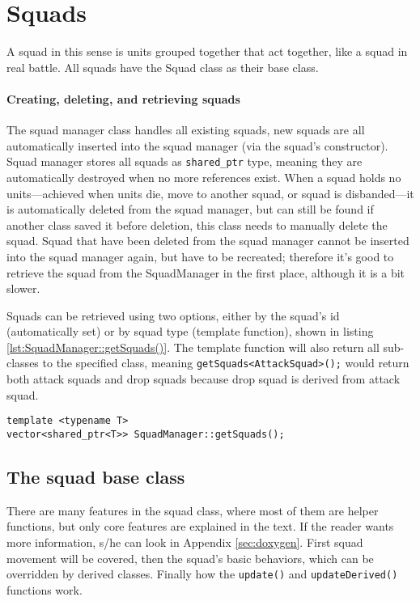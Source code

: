 \section{Squads}
A squad in this sense is units grouped together that act together, like a squad in real battle. All squads have the Squad class as their base class. 

\paragraph{Creating, deleting, and retrieving squads}
The squad manager class handles all existing squads, new squads are all automatically inserted into the squad manager (via the squad's constructor). Squad manager stores all squads as \texttt{shared\_ptr} type, meaning they are automatically destroyed when no more references exist. When a squad holds no units—achieved when units die, move to another squad, or squad is disbanded—it is automatically deleted from the squad manager, but can still be found if another class saved it before deletion, this class needs to manually delete the squad. Squad that have been deleted from the squad manager cannot be inserted into the squad manager again, but have to be recreated; therefore it's good to retrieve the squad from the SquadManager in the first place, although it is a bit slower.

Squads can be retrieved using two options, either by the squad's id (automatically set) or by squad type (template function), shown in listing \ref{lst:SquadManager::getSquads()}. The template function will also return all sub-classes to the specified class, meaning \texttt{getSquads<AttackSquad>();} would return both attack squads and drop squads because drop squad is derived from attack squad.
\begin{lstlisting}[caption={Template function to retrieve squads of the specified type.},label={lst:SquadManager::getSquads()}]
template <typename T>
vector<shared_ptr<T>> SquadManager::getSquads();
\end{lstlisting}

\subsection{The squad base class}
There are many features in the squad class, where most of them are helper functions, but only core features are explained in the text. If the reader wants more information, s/he can look in Appendix \ref{sec:doxygen}. First squad movement will be covered, then the squad's basic behaviors, which can be overridden by derived classes. Finally how the \texttt{update()} and \texttt{updateDerived()} functions work.

